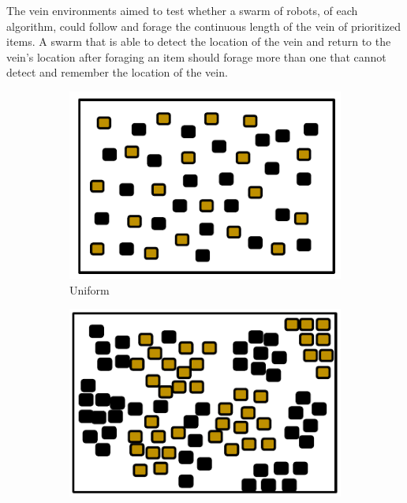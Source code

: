 \begin{enumerate}
The vein environments aimed to test whether a swarm of robots, of each algorithm, could follow and forage the continuous length of the vein of prioritized items. A swarm that is able to detect the location of the vein and return to the vein's location after foraging an item should forage more than one that cannot detect and remember the location of the vein.

\end{enumerate} 

\begin{figure} [h]
        \centering
        \begin{subfigure}[b]{0.21\textwidth}
                \includegraphics[width=\textwidth]{chapters/chapter4/figures/uniformenv.pdf}
                \caption{Uniform}
                \label{fig:uniformenv}
        \end{subfigure}%
        \begin{subfigure}[b]{0.205\textwidth}
                \includegraphics[width=\textwidth]{chapters/chapter4/figures/clusterenv.pdf}

\end{subfigure}
\end{figure}
